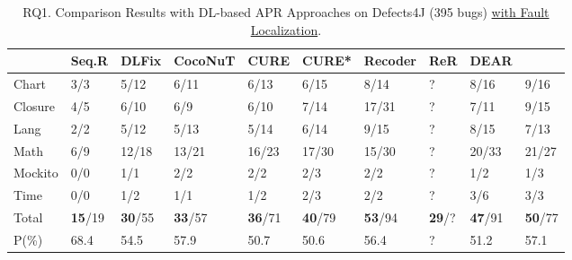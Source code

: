 



\begin{table}[t]
  \caption{RQ1. Comparison Results with DL-based APR Approaches on Defects4J (395 bugs) \underline {with Fault Localization}.}
  \vspace{-6pt}
         {\footnotesize
        \tabcolsep 2.5pt
			\begin{center}
				\renewcommand{\arraystretch}{1}
				\begin{tabular}{p{0.7cm}<{\centering}|p{0.6cm}<{\centering}|p{0.6cm}<{\centering}|p{1cm}<{\centering}|p{0.7cm}<{\centering}|p{0.7cm}<{\centering}|p{0.8cm}<{\centering}|p{0.5cm}<{\centering}|p{0.7cm}<{\centering}|p{0.7cm}<{\centering}}
					
					\hline
					&\textbf{Seq.R}&\textbf{DLFix}& \textbf{CocoNuT}&\textbf{CURE}&\textbf{CURE*}& {\bf Recoder} & {\bf ReR} & {\bf DEAR} &\textbf{\tool}\\
					\hline
					Chart  & 3/3   & 5/12  & 6/11  & 6/13  & 6/15 & 8/14& ? & 8/16 & 9/16\\
					Closure& 4/5   & 6/10  & 6/9   & 6/10  & 7/14 & 17/31 & ? & 7/11 & 9/15\\
					Lang   & 2/2   & 5/12  & 5/13  & 5/14  & 6/14  & 9/15 & ?  & 8/15 & 7/13\\
					Math    & 6/9  & 12/18 & 13/21 & 16/23 & 17/30 & 15/30 & ? & 20/33 & 21/27\\
					Mockito & 0/0   & 1/1   & 2/2   & 2/2  & 2/3  & 2/2 & ? & 1/2 & 1/3\\
					Time    & 0/0   & 1/2   & 1/1   & 1/2  & 2/3 & 2/2 &? & 3/6 & 3/3\\
					\hline
					Total   & {\bf 15}/19 & {\bf 30}/55 & {\bf 33}/57 & {\bf 36}/71 & {\bf 40}/79 & {\bf 53}/94 & {\bf 29}/? & {\bf 47}/91 & {\bf 50}/77\\
					\hline
					P(\%)  & 68.4  & 54.5  & 57.9  & 50.7  & 50.6 & 56.4& ? & 51.2 & 57.1\\
					\hline
				\end{tabular}
				\label{RQ1_defects4J_with_FL}
			\end{center}
                }
		\end{table}


